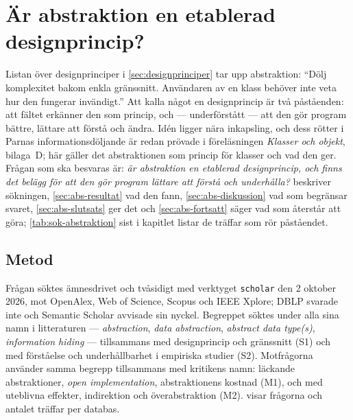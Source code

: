 \chapter{Är abstraktion en etablerad designprincip?}
\label{app:abstraktion}

Listan över designprinciper i \cref{sec:designprinciper} tar upp
abstraktion: \enquote{Dölj komplexitet bakom enkla gränssnitt.
Användaren av en klass behöver inte veta hur den fungerar invändigt.}
Att kalla något en designprincip är två påståenden: att fältet erkänner
den som princip, och --- underförstått --- att den gör program bättre,
lättare att förstå och ändra.  Idén ligger nära inkapsling, och dess
rötter i Parnas informationsdöljande\autocite{Parnas1972Criteria} är
redan prövade i föreläsningen \emph{Klasser och objekt}, bilaga~D;
här gäller det abstraktionen som princip för klasser och vad den ger.
Frågan som ska besvaras är: \emph{är abstraktion en etablerad
designprincip, och finns det belägg för att den gör program lättare att
förstå och underhålla?}   beskriver sökningen,
\cref{sec:abs-resultat} vad den fann, \cref{sec:abs-diskussion} vad som
begränsar svaret, \cref{sec:abs-slutsats} ger det och
\cref{sec:abs-fortsatt} säger vad som återstår att göra;
\cref{tab:sok-abstraktion} sist i kapitlet listar de träffar som rör
påståendet.

\section{Metod}
\label{sec:abs-metod}

Frågan söktes ämnesdrivet och tvåsidigt med verktyget \texttt{scholar}
den 2 oktober 2026, mot OpenAlex, Web of Science, Scopus och IEEE Xplore;
DBLP svarade inte och Semantic Scholar avvisade sin nyckel.  Begreppet
söktes under alla sina namn i litteraturen --- \emph{abstraction},
\emph{data abstraction}, \emph{abstract data type(s)}, \emph{information
hiding} --- tillsammans med designprincip och gränssnitt (S1) och med
förståelse och underhållbarhet i empiriska studier (S2).  Motfrågorna
använder samma begrepp tillsammans med kritikens namn: läckande
abstraktioner, \emph{open implementation}, abstraktionens kostnad (M1),
och med uteblivna effekter, indirektion och överabstraktion (M2).
 visar frågorna och antalet träffar per
databas.

